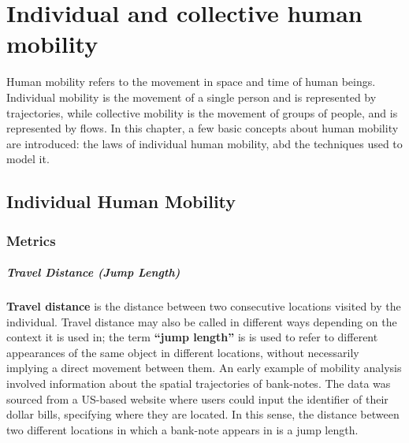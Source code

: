 \chapter{Individual and collective human mobility}

Human mobility refers to the movement in space and time of human beings. Individual mobility is the movement of a single person and is represented by trajectories, while collective mobility is the movement of groups of people, and is represented by flows.  In this chapter, a few basic concepts about human mobility are introduced: the laws of individual human mobility, abd the techniques used to model it.

\section{Individual Human Mobility}

\subsection{Metrics}

\paragraph{Travel Distance (Jump Length)}

\textbf{Travel distance} is the distance between two consecutive locations visited by the individual. Travel distance may also be called in different ways depending on the context it is used in; the term \textbf{``jump length''} is is used to refer to different appearances of the same object in different locations, without necessarily implying a direct movement between them. An early example of mobility analysis involved information about the spatial trajectories of bank-notes. The data was sourced from a US-based website where users could input the identifier of their dollar bills, specifying where they are located. In this sense, the distance between two different locations in which a bank-note appears in is a jump length.

